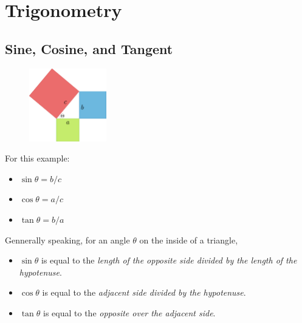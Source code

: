 \chapter{Trigonometry}

\section{Sine, Cosine, and Tangent}
\begin{figure}[H]
  \begin{center}
    \includegraphics[width=0.3\textwidth]{continuous/trig/basictrig.eps}
  \end{center}
\end{figure}

For this example:
\begin{itemize}
  \item $\sin\theta=b/c$
  \item $\cos\theta=a/c$
  \item $\tan\theta=b/a$
\end{itemize}
Gennerally speaking, for an angle $\theta$ on the inside of a triangle,
\begin{itemize}
  \item$\sin\theta$ is equal to the \emph{length of the opposite side divided by the length of the hypotenuse}.
  \item$\cos\theta$ is equal to the \emph{adjacent side divided by the hypotenuse}.
  \item$\tan\theta$ is equal to the \emph{opposite over the adjacent side}.
\end{itemize}



